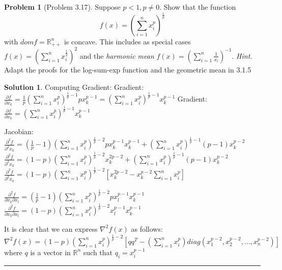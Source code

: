 \documentclass{article}
\theoremstyle{definition}
\newtheorem{problem}{Problem}
\def\fline{\rule{0.75\linewidth}{0.5pt}}
\newcommand{\finishline}{\begin{center}\fline\end{center}}
\newtheorem*{solution*}{Solution}
\newenvironment{solution}{\begin{solution*}}{{\finishline} \end{solution*}}
\begin{document}
\begin{problem} [Problem 3.17]
Suppose $p < 1, p \neq 0$. Show that the function 
\begin{equation}
    f(x) = (\sum_{i=1}^{n} x_i^p)^{\frac{1}{p}}
\end{equation}
with $dom f = \mathbb{R}^n_{++}$ is concave. This includes as special cases $f(x) = (\sum_{i=1}^{n} x_i^{\frac{1}{2}})^{2}$ and the \textit{harmonic mean} $f(x) = (\sum_{i=1}^{n} \frac{1}{x_i})^{-1}$. \textit{Hint.} Adapt the proofs for the log-sum-exp
function and the geometric mean in 3.1.5

\begin{solution}

Computing Gradient: \newline 
Gradient: $\frac{\partial{f}}{\partial{x_k}} = \frac{1}{p} (\sum_{i=1}^{n} x_i^p)^{\frac{1}{p} - 1} p x_k^{p - 1} = (\sum_{i=1}^{n} x_i^p)^{\frac{1}{p} - 1} x_k^{p - 1}$ \newline 
    Gradient: $\frac{\partial{f}}{\partial{x_k}} = (\sum_{i=1}^{n} x_i^p)^{\frac{1}{p} - 1} x_k^{p - 1}$

    Jacobian: \newline 
    $\frac{\partial^2{f}}{\partial^2{x_k}} = (\frac{1}{p} - 1) (\sum_{i=1}^{n} x_i^p)^{\frac{1}{p} - 2} p x_k^{p - 1} x_k^{p - 1} + (\sum_{i=1}^{n} x_i^p)^{\frac{1}{p} - 1} (p - 1) x_k^{p-2}$ \newline 
    $\frac{\partial^2{f}}{\partial^2{x_k}} = (1 - p) (\sum_{i=1}^{n} x_i^p)^{\frac{1}{p} - 2} x_k^{2p - 2} + (\sum_{i=1}^{n} x_i^p)^{\frac{1}{p} - 1} (p - 1) x_k^{p-2}$ \newline 
    $\frac{\partial^2{f}}{\partial^2{x_k}} = (1 - p) (\sum_{i=1}^{n} x_i^p)^{\frac{1}{p} - 2} [x_k^{2p - 2} - x_k^{p - 2} \sum_{i=1}^{n} x_i^p]$ \newline 


    $\frac{\partial^2{f}}{\partial{x_k} \partial{x_l}} = (\frac{1}{p} - 1) (\sum_{i=1}^{n} x_i^p)^{\frac{1}{p} - 2} p x_l^{p - 1} x_k^{p - 1}$ \newline
    $\frac{\partial^2{f}}{\partial{x_k} \partial{x_l}} = (1 - p) (\sum_{i=1}^{n} x_i^p)^{\frac{1}{p} - 2} x_l^{p - 1} x_k^{p - 1}$ \newline 

    It is clear that we can express $\nabla^2f(x)$ as follows: \newline 
    $\nabla^2f(x) = (1 - p) (\sum_{i=1}^{n} x_i^p)^{\frac{1}{p} - 2} [qq^T - (\sum_{i=1}^{n} x_i^p) diag(x_1^{p - 2}, x_2^{p - 2}, \dots, x_n^{p - 2})]$ where $q$ is a vector in $\mathbb{R}^n$ such that $q_i = x_i^{p - 1}$ \newline 


\end{solution}
\end{problem}
\end{document}
